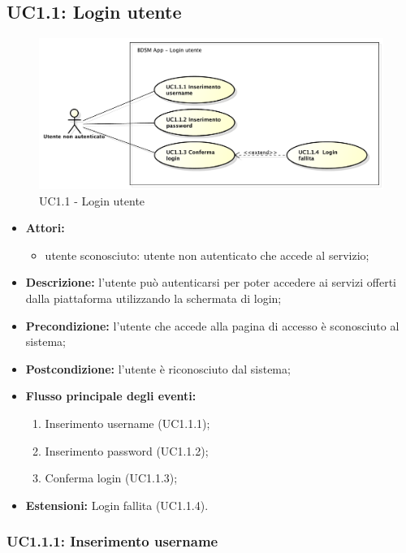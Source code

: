 \pagebreak

\subsection{UC1.1: Login utente}

\begin{figure}[htbp]
    \centering
    \centerline{\includegraphics[scale=0.5]{./images/UC1_1.pdf}}
    \caption{UC1.1 - Login utente}
\end{figure}

\begin{itemize}
    \item \textbf{Attori:}
    \begin{itemize}
        \item utente sconosciuto: utente non autenticato che accede al servizio;
    \end{itemize}
    \item \textbf{Descrizione:} l'utente può autenticarsi per poter accedere ai servizi offerti dalla piattaforma utilizzando la schermata di login;
    \item \textbf{Precondizione:} l'utente che accede alla pagina di accesso è sconosciuto al sistema;
    \item \textbf{Postcondizione:} l'utente è riconosciuto dal sistema;
    \item \textbf{Flusso principale degli eventi:}
    \begin{enumerate}
        \item Inserimento username (UC1.1.1);
        \item Inserimento password (UC1.1.2);
        \item Conferma login (UC1.1.3);
    \end{enumerate}
    \item \textbf{Estensioni:} Login fallita (UC1.1.4).
\end{itemize}


\subsubsection{UC1.1.1: Inserimento username}

